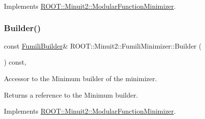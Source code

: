 Implements \mbox{\hyperlink{classROOT_1_1Minuit2_1_1ModularFunctionMinimizer_a13e98551cf14e927c61e1e34ecf8ba8b}{R\+O\+O\+T\+::\+Minuit2\+::\+Modular\+Function\+Minimizer}}.

\mbox{\label{classROOT_1_1Minuit2_1_1FumiliMinimizer_a24d20e7cd4a335f60616fd7cafe0739c}} 
\subsubsection{\texorpdfstring{Builder()}{Builder()}\hspace{0.1cm}{\footnotesize\ttfamily [3/3]}}
{\footnotesize\ttfamily const \mbox{\hyperlink{classROOT_1_1Minuit2_1_1FumiliBuilder}{Fumili\+Builder}}\& R\+O\+O\+T\+::\+Minuit2\+::\+Fumili\+Minimizer\+::\+Builder (\begin{DoxyParamCaption}{ }\end{DoxyParamCaption}) const\hspace{0.3cm}{\ttfamily [inline]}, {\ttfamily [virtual]}}

Accessor to the Minimum builder of the minimizer.

\begin{DoxyReturn}{Returns}
a reference to the Minimum builder. 
\end{DoxyReturn}


Implements \mbox{\hyperlink{classROOT_1_1Minuit2_1_1ModularFunctionMinimizer_a13e98551cf14e927c61e1e34ecf8ba8b}{R\+O\+O\+T\+::\+Minuit2\+::\+Modular\+Function\+Minimizer}}.

\mbox{\label{classROOT_1_1Minuit2_1_1FumiliMinimizer_a3da0ec7b2ba7f876809f72d2f3054eec}} 
